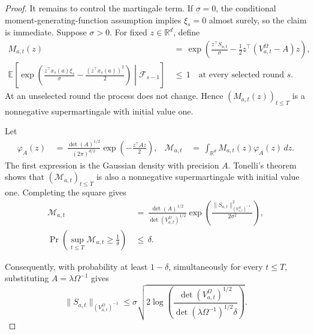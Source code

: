 \documentclass{article} %
\begin{document}
\begin{proof}
It remains to control the martingale term. If \(\sigma=0\), the conditional
moment-generating-function assumption implies \(\xi_s=0\) almost surely, so
the claim is immediate. Suppose \(\sigma>0\). For fixed
\(z\in\mathbb{R}^d\), define
\begin{equation}
\label{eq:hyper-sn-proof-mgf}
\begin{aligned}
M_{a,t}(z)
&\,=\,
\exp\!\left(
\frac{z^\top S_{a,t}}{\sigma}
-
\frac{1}{2}
z^\top
\left(V_{a,t}^{\Omega}-A\right)
z
\right),
\\
\mathbb E\!\left[
\exp\!\left(
\frac{z^\top x_s(a)\xi_s}{\sigma}
-\frac{(z^\top x_s(a))^2}{2}
\right)
\middle|\mathcal F_{s-1}
\right]
&\,\leq\,
1
\quad\text{at every selected round \(s\)}.
\end{aligned}
\end{equation}
At an unselected round the process does not change. Hence
\((M_{a,t}(z))_{t\le T}\) is a nonnegative supermartingale with initial value
one.

Let
\begin{equation}
\begin{aligned}
\varphi_A(z)
&\,=\,
\frac{\det(A)^{1/2}}{(2\pi)^{d/2}}
\exp\!\left(-\frac{z^\top A z}{2}\right),
&
\mathcal M_{a,t}
&\,=\,
\int_{\mathbb R^d}M_{a,t}(z)\varphi_A(z)\,dz.
\end{aligned}
\end{equation}
The first expression is the Gaussian density with precision \(A\).
Tonelli's theorem shows that \((\mathcal M_{a,t})_{t\le T}\) is also a
nonnegative supermartingale with initial value one. Completing the square gives
\begin{align}
\mathcal M_{a,t}
&\,=\,
\frac{\det(A)^{1/2}}{\det(V_{a,t}^{\Omega})^{1/2}}
\exp\!\left(
\frac{
\|S_{a,t}\|_{\left(V_{a,t}^{\Omega}\right)^{-1}}^2
}{2\sigma^2}
\right),
\label{eq:hyper-sn-proof-mixture}
\\
\Pr\!\left(
\sup_{t\le T}\mathcal M_{a,t}
\ge
\frac{1}{\delta}
\right)
&\,\leq\,
\delta.
\label{eq:hyper-sn-proof-ville}
\end{align}

Consequently, with probability at least \(1-\delta\), simultaneously for every
\(t\le T\), substituting \(A=\lambda\Omega^{-1}\) gives
\begin{equation}
\label{eq:hyper-sn-proof-event}
\|S_{a,t}\|_{\left(V_{a,t}^{\Omega}\right)^{-1}}
\le
\sigma
\sqrt{
2\log
\left(
\frac{
\det(V_{a,t}^{\Omega})^{1/2}
}{
\det(\lambda\Omega^{-1})^{1/2}\delta
}
\right)
}.
\end{equation}


\end{proof}
\end{document}
